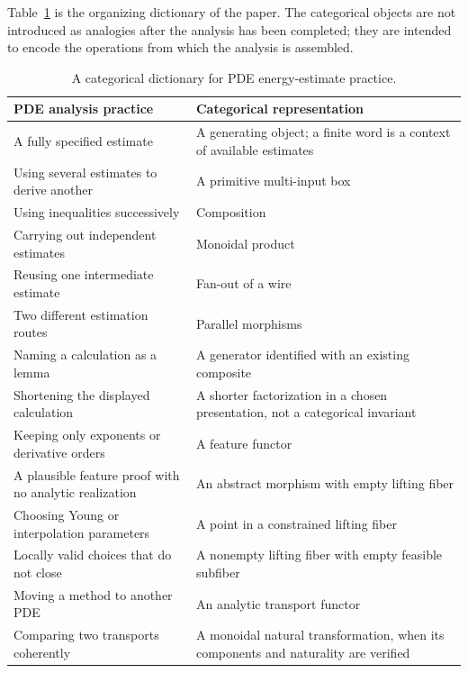 \documentclass[10pt,journal,a4paper]{IEEEtran}
\theoremstyle{definition}
\begin{document}
Table~\ref{tab:dictionary} is the organizing dictionary of the paper. The categorical objects are not introduced as analogies after the analysis has been completed; they are intended to encode the operations from which the analysis is assembled.

\begin{table}[!t]
\centering
\small
\renewcommand{\arraystretch}{1.13}
\caption{A categorical dictionary for PDE energy-estimate practice.}
\label{tab:dictionary}
\begin{tabular}{>{\raggedright\arraybackslash}p{}
                >{\raggedright\arraybackslash}p{}}
\toprule
PDE analysis practice & Categorical representation \\
\midrule
A fully specified estimate & A generating object; a finite word is a context of available estimates \\
Using several estimates to derive another & A primitive multi-input box \\
Using inequalities successively & Composition \\
Carrying out independent estimates & Monoidal product \\
Reusing one intermediate estimate & Fan-out of a wire \\
Two different estimation routes & Parallel morphisms \\
Naming a calculation as a lemma & A generator identified with an existing composite \\
Shortening the displayed calculation & A shorter factorization in a chosen presentation, not a categorical invariant \\
Keeping only exponents or derivative orders & A feature functor \\
A plausible feature proof with no analytic realization & An abstract morphism with empty lifting fiber \\
Choosing Young or interpolation parameters & A point in a constrained lifting fiber \\
Locally valid choices that do not close & A nonempty lifting fiber with empty feasible subfiber \\
Moving a method to another PDE & An analytic transport functor \\
Comparing two transports coherently & A monoidal natural transformation, when its components and naturality are verified \\
\bottomrule
\end{tabular}
\end{table}
\end{document}
